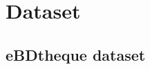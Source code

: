 \chapter{Dataset}
\label{app:dataset}
\graphicspath{{./chapters/Appendix/figs/}}

\section{eBDtheque dataset}



